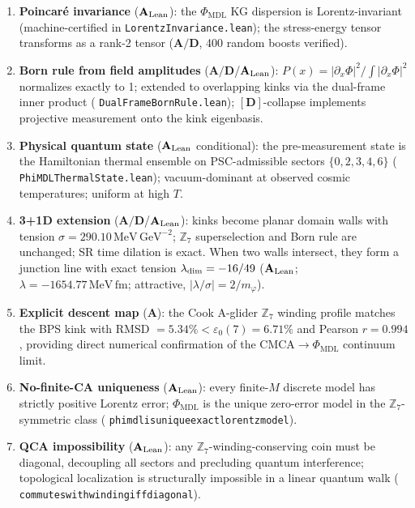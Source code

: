 \documentclass[11pt]{article}
\theoremstyle{remark}
\newcommand{\PHIMDL}{\Phi_{\mathrm{MDL}}}
\newcommand{\ZS}{\mathbb{Z}_7}
\newcommand{\lean}[1]{%
  \penalty-100
  \begingroup\def\_{\textunderscore\allowbreak}\texttt{#1}\endgroup}
\newcommand{\epsz}{\varepsilon_0}
\newcommand{\CatA}{\textbf{A}}
\newcommand{\CatAL}{\ensuremath{\textbf{A}_{\rm Lean}}}
\newcommand{\CatAD}{\textbf{A/D}}
\begin{document}
\begin{enumerate}[noitemsep]
  \item \textbf{Poincar\'e invariance} ($\CatAL$): the $\PHIMDL$ KG dispersion
    is Lorentz-invariant (machine-certified in \lean{LorentzInvariance.lean});
    the stress-energy tensor transforms as a rank-2 tensor ($\CatAD$, 400
    random boosts verified).

  \item \textbf{Born rule from field amplitudes} ($\CatAD$/$\CatAL$):
    $P(x) = |\partial_x\Phi|^2/\int|\partial_x\Phi|^2$ normalizes exactly
    to 1; extended to overlapping kinks via the dual-frame inner product
    (\lean{DualFrameBornRule.lean}); $[\mathbf{D}]$-collapse implements
    projective measurement onto the kink eigenbasis.

  \item \textbf{Physical quantum state} ($\CatAL$ conditional): the
    pre-measurement state is the Hamiltonian thermal ensemble on
    PSC-admissible sectors $\{0,2,3,4,6\}$ (\lean{PhiMDLThermalState.lean});
    vacuum-dominant at observed cosmic temperatures; uniform at high $T$.

  \item \textbf{3+1D extension} ($\CatAD$/$\CatAL$): kinks become planar domain walls
    with tension $\sigma = 290.10\,\mathrm{MeV\,GeV}^{-2}$; $\ZS$
    superselection and Born rule are unchanged; SR time dilation is exact.
    When two walls intersect, they form a junction line with exact tension
    $\lambda_{\rm dim}=-16/49$ ($\CatAL$;
    $\lambda=-1654.77\,\mathrm{MeV\,fm}$; attractive, $|\lambda/\sigma|=2/m_\varphi$).

  \item \textbf{Explicit descent map} ($\CatA$): the Cook A-glider $\ZS$ winding
    profile matches the BPS kink with RMSD $= 5.34\% < \epsz(7) = 6.71\%$
    and Pearson $r = 0.994$, providing direct numerical confirmation of
    the CMCA$\to\PHIMDL$ continuum limit.

  \item \textbf{No-finite-CA uniqueness} ($\CatAL$): every finite-$M$ discrete
    model has strictly positive Lorentz error; $\PHIMDL$ is the unique
    zero-error model in the $\ZS$-symmetric class
    (\lean{phimdl\_is\_unique\_exact\_lorentz\_model}).

  \item \textbf{QCA impossibility} ($\CatAL$): any $\ZS$-winding-conserving coin
    must be diagonal, decoupling all sectors and precluding quantum interference;
    topological localization is structurally impossible in a linear quantum walk
    (\lean{commutes\_with\_winding\_iff\_diagonal}).


\end{enumerate}
\end{document}
